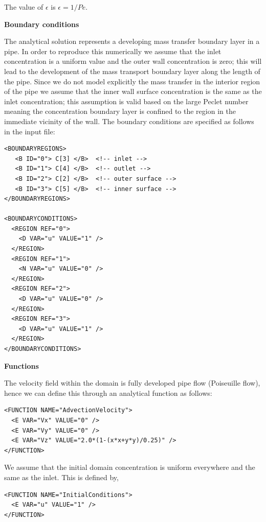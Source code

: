 The value of $\epsilon$ is $\epsilon = 1/Pe$.

\textbf{\footnotesize{Boundary conditions}}

The analytical solution represents a developing mass transfer boundary layer in a pipe. In order to 
reproduce this numerically we assume that the inlet concentration is a uniform value and the outer 
wall concentration is zero; this will lead to the development of the mass transport boundary layer along the length 
of the pipe. Since we do not model explicitly the mass transfer in the interior region of the pipe we assume that 
the inner wall surface concentration is the same as the inlet concentration; this assumption is valid based on the large 
Peclet number meaning the concentration boundary layer is confined to the region in the immediate vicinity of the wall.
 The boundary conditions are specified as follows in the input file:

\begin{lstlisting}[style=XMLStyle]
<BOUNDARYREGIONS>
   <B ID="0"> C[3] </B>  <!-- inlet -->
   <B ID="1"> C[4] </B>  <!-- outlet -->
   <B ID="2"> C[2] </B>  <!-- outer surface -->
   <B ID="3"> C[5] </B>  <!-- inner surface -->
</BOUNDARYREGIONS>

<BOUNDARYCONDITIONS>
  <REGION REF="0">
    <D VAR="u" VALUE="1" />
  </REGION>
  <REGION REF="1">
    <N VAR="u" VALUE="0" />
  </REGION>
  <REGION REF="2">
    <D VAR="u" VALUE="0" />
  </REGION>
  <REGION REF="3">
    <D VAR="u" VALUE="1" />
  </REGION>
</BOUNDARYCONDITIONS>
\end{lstlisting}


\textbf{\footnotesize{Functions}}

The velocity field within the domain is fully developed pipe flow (Poiseuille flow), hence we 
can define this through an analytical function as follows:

\begin{lstlisting}[style=XMLStyle]
<FUNCTION NAME="AdvectionVelocity">
  <E VAR="Vx" VALUE="0" />
  <E VAR="Vy" VALUE="0" />
  <E VAR="Vz" VALUE="2.0*(1-(x*x+y*y)/0.25)" />
</FUNCTION>
\end{lstlisting}

We assume that the initial domain concentration is uniform everywhere and the same as the inlet. This is defined by,

\begin{lstlisting}[style=XMLStyle]
<FUNCTION NAME="InitialConditions">
  <E VAR="u" VALUE="1" />
</FUNCTION>
\end{lstlisting}

